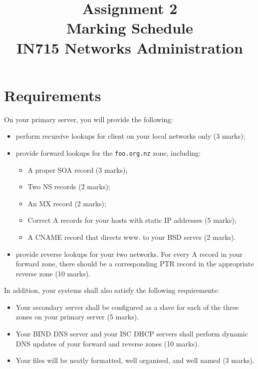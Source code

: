 \documentclass{article}
\begin{document}
\title{ Assignment 2 \\ Marking Schedule \\ IN715 Networks Administration}
\date{}
\maketitle



\section*{Requirements}

On your primary server, you will provide the following:
\begin{itemize}
    \item perform recursive lookups for client on your local networks only (3 marks);
    \item provide forward lookups for the \texttt{foo.org.nz} zone, 
          including:
          \begin{itemize}
            \item A proper SOA record (3 marks);
            \item Two NS records (2 marks);
            \item An MX record (2 marks);
            \item Correct A records for your hosts with static IP addresses (5 marks);
            \item A CNAME record that directs www. to your
                  BSD server (2 marks).
          \end{itemize}
    \item provide reverse lookups for your two networks.  For every A record 
          in your forward zone, there should be a corresponding PTR record 
          in the appropriate reverse zone (10 marks).
\end{itemize}

In addition, your systems shall also satisfy the following requirements:

\begin{itemize}
	
    \item Your secondary server shall be configured as a slave for each of the three zones on your primary server (5 marks).

    \item Your BIND DNS server and your ISC DHCP servers shall perform dynamic DNS updates of your forward and reverse zones (10 marks).
    
    \item Your files will be neatly formatted, well organised, and well named (3 marks).

\end{itemize}
\end{document}
